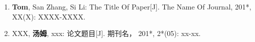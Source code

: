 \chapter*{}
\begin{enumerate}
	\renewcommand{\labelenumi}{[\theenumi]}
	\renewcommand\baselinestretch{1}\selectfont   
	\item \textbf{Tom}, San Zhang, Si Li: The Title Of Paper[J]. The Name Of Journal, 201*, XX(X): XXXX-XXXX.
	\item XXX, \textbf{汤姆}, xxx: 论文题目[J]. 期刊名， 201*, 2*(05): xx-xx.
\end{enumerate}
